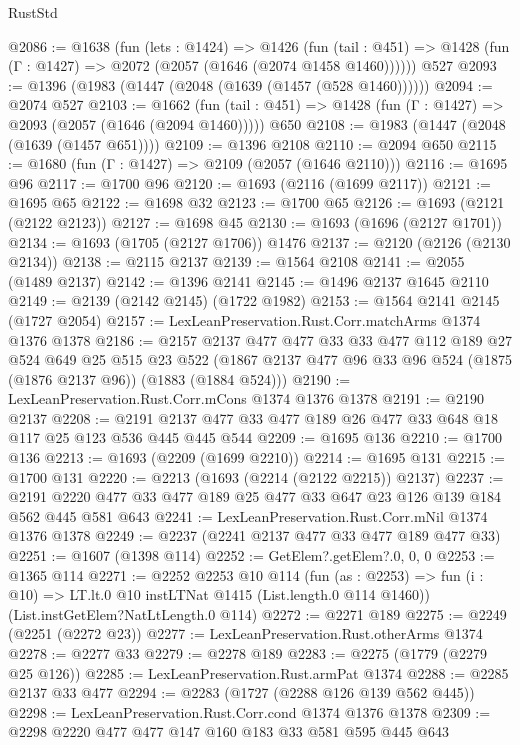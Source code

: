 \begin{lexlean}{RustStd}
\begin{coremodule}
{\begin{coremodule}
{{{{{{{{{{{@2086 := @1638
    (fun (lets : @1424) =>
    @1426
      (fun (tail : @451) => @1428 (fun (Γ : @1427) => @2072 (@2057 (@1646 (@2074 @1458 @1460))))))
    @527
@2093 := @1396 (@1983 (@1447 (@2048 (@1639 (@1457 (@528 @1460))))))
@2094 := @2074 @527
@2103 := @1662
    (fun (tail : @451) => @1428 (fun (Γ : @1427) => @2093 (@2057 (@1646 (@2094 @1460)))))
    @650
@2108 := @1983 (@1447 (@2048 (@1639 (@1457 @651))))
@2109 := @1396 @2108
@2110 := @2094 @650
@2115 := @1680 (fun (Γ : @1427) => @2109 (@2057 (@1646 @2110)))
@2116 := @1695 @96
@2117 := @1700 @96
@2120 := @1693 (@2116 (@1699 @2117))
@2121 := @1695 @65
@2122 := @1698 @32
@2123 := @1700 @65
@2126 := @1693 (@2121 (@2122 @2123))
@2127 := @1698 @45
@2130 := @1693 (@1696 (@2127 @1701))
@2134 := @1693 (@1705 (@2127 @1706)) @1476
@2137 := @2120 (@2126 (@2130 @2134))
@2138 := @2115 @2137
@2139 := @1564 @2108
@2141 := @2055 (@1489 @2137)
@2142 := @1396 @2141
@2145 := @1496 @2137 @1645 @2110
@2149 := @2139 (@2142 @2145) (@1722 @1982)
@2153 := @1564 @2141 @2145 (@1727 @2054)
@2157 := LexLeanPreservation.Rust.Corr.matchArms @1374 @1376 @1378
@2186 := @2157
    @2137
    @477
    @477
    @33
    @33
    @477
    @112
    @189
    @27
    @524
    @649
    @25
    @515
    @23
    @522
    (@1867 @2137 @477 @96 @33 @96 @524 (@1875 (@1876 @2137 @96)) (@1883 (@1884 @524)))
@2190 := LexLeanPreservation.Rust.Corr.mCons @1374 @1376 @1378
@2191 := @2190 @2137
@2208 := @2191 @2137 @477 @33 @477 @189 @26 @477 @33 @648 @18 @117 @25 @123 @536 @445 @445 @544
@2209 := @1695 @136
@2210 := @1700 @136
@2213 := @1693 (@2209 (@1699 @2210))
@2214 := @1695 @131
@2215 := @1700 @131
@2220 := @2213 (@1693 (@2214 (@2122 @2215)) @2137)
@2237 := @2191 @2220 @477 @33 @477 @189 @25 @477 @33 @647 @23 @126 @139 @184 @562 @445 @581 @643
@2241 := LexLeanPreservation.Rust.Corr.mNil @1374 @1376 @1378
@2249 := @2237 (@2241 @2137 @477 @33 @477 @189 @477 @33)
@2251 := @1607 (@1398 @114)
@2252 := GetElem?.getElem?.{0, 0, 0}
@2253 := @1365 @114
@2271 := @2252
    @2253
    @10
    @114
    (fun (as : @2253) =>
    fun (i : @10) => LT.lt.{0} @10 instLTNat @1415 (List.length.{0} @114 @1460))
    (List.instGetElem?NatLtLength.{0} @114)
@2272 := @2271 @189
@2275 := @2249 (@2251 (@2272 @23))
@2277 := LexLeanPreservation.Rust.otherArms @1374
@2278 := @2277 @33
@2279 := @2278 @189
@2283 := @2275 (@1779 (@2279 @25 @126))
@2285 := LexLeanPreservation.Rust.armPat @1374
@2288 := @2285 @2137 @33 @477
@2294 := @2283 (@1727 (@2288 @126 @139 @562 @445))
@2298 := LexLeanPreservation.Rust.Corr.cond @1374 @1376 @1378
@2309 := @2298 @2220 @477 @477 @147 @160 @183 @33 @581 @595 @445 @643
}}}}}}}}}}}
\end{coremodule}}
\end{coremodule}
\end{lexlean}
